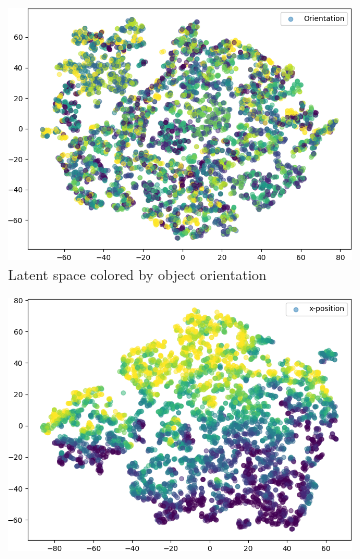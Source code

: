 \begin{figure}
\begin{adjustbox}{valign=T}
\begin{subfigure}{.19\textwidth}
            \label{subfig:vae_embedding_dsprites_scale}
        \end{subfigure}
    \end{adjustbox}
    \hfill
    \begin{adjustbox}{valign=T}
        \begin{subfigure}{.19\textwidth}
            \includegraphics[width=\textwidth]{images/latent_spaces/dsprites/vae/embeddings_mu_2.png}
            \caption{Latent space colored by object orientation}
            \label{subfig:vae_embedding_dsprites_orientation}
        \end{subfigure}
    \end{adjustbox}
    \hfill
    \begin{adjustbox}{valign=T}
        \begin{subfigure}{.19\textwidth}
            \includegraphics[width=\textwidth]{images/latent_spaces/dsprites/vae/embeddings_mu_3.png}

\end{subfigure}
\end{adjustbox}
\end{figure}
